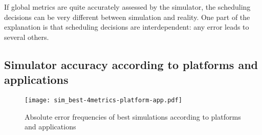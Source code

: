 \documentclass[a4paper,10pt]{article}
\begin{document}
If global metrics are quite accurately assessed by the simulator, 
the scheduling decisions can be very different between simulation and reality. 
One part of the explanation is that scheduling decisions are interdependent: 
any error leads to several others.


\subsection{Simulator accuracy according to platforms and applications}


\begin{figure}
  \texttt{[image: sim\_best-4metrics-platform-app.pdf]}
\caption{Absolute error frequencies of best simulations according to platforms 
and applications}
\end{figure} 
\end{document}
